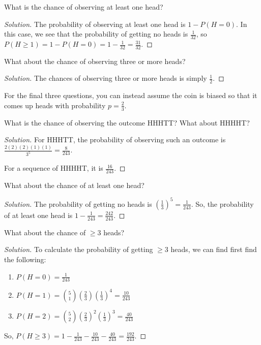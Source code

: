 \documentclass{article}
\newenvironment{solution}{\begin{proof}[Solution]}{\end{proof}}
\begin{document}
\begin{hw}
	What is the chance of observing at least one head?
\end{hw}
\begin{solution}
	The probability of observing at least one head is $1 - P(H = 0)$. In this case, we see that the probability of getting no heads is $\frac{1}{32}$, so $P(H \geq 1) = 1 - P(H = 0) = 1 - \frac{1}{32} = \frac{31}{32}$.
\end{solution}

\begin{hw}
	What about the chance of observing three or more heads?
\end{hw}
\begin{solution}
	The chances of observing three or more heads is simply $\frac{1}{2}$.
\end{solution}

For the final three questions, you can instead assume the coin is biased so that it comes up heads with probability $p = \frac{2}{3}$.

\begin{hw}
	What is the chance of observing the outcome HHHTT? What about HHHHT?
\end{hw}
\begin{solution}
	For HHHTT, the probability of observing such an outcome is $\frac{2(2)(2)(1)(1)}{3^{5}} = \frac{8}{243}$.
	
	For a sequence of HHHHT, it is $\frac{16}{243}$.
\end{solution}

\begin{hw}
	What about the chance of at least one head?
\end{hw}
\begin{solution}
	The probability of getting no heads is $\left( \frac{1}{3} \right)^{5} = \frac{1}{243}$. So, the probability of at least one head is $1 - \frac{1}{243} = \frac{242}{243}$.
\end{solution}

\begin{hw}
	What about the chance of $\geq 3$ heads?
\end{hw}
\begin{solution}
	To calculate the probability of getting $\geq 3$ heads, we can find first find the following:
	\begin{enumerate}
		\item $P(H = 0) = \frac{1}{243}$
		\item $P(H = 1) = \binom{5}{1}\left( \frac{2}{3} \right)\left( \frac{1}{3} \right)^{4} = \frac{10}{243}$
		\item $P(H = 2) = \binom{5}{2} \left( \frac{2}{3} \right)^{2} \left( \frac{1}{3} \right)^{3} = \frac{40}{243}$
	\end{enumerate}

	So, $P(H \geq 3) = 1 - \frac{1}{243} - \frac{10}{243} - \frac{40}{243} = \frac{192}{243}$.
\end{solution}
\end{document}

